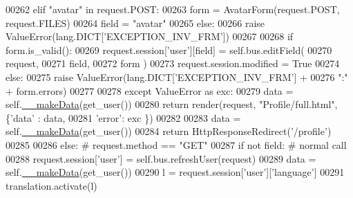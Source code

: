 \begin{DoxyCode}
00262                 \textcolor{keywordflow}{elif} \textcolor{stringliteral}{"avatar"} \textcolor{keywordflow}{in} request.POST:
00263                     form = AvatarForm(request.POST, request.FILES)
00264                     field = \textcolor{stringliteral}{"avatar"}
00265                 \textcolor{keywordflow}{else}:
00266                     \textcolor{keywordflow}{raise} ValueError(lang.DICT[\textcolor{stringliteral}{'EXCEPTION\_INV\_FRM'}])
00267 
00268                 \textcolor{keywordflow}{if} form.is\_valid():
00269                     request.session[\textcolor{stringliteral}{'user'}][field] = self.bus.editField(
00270                                                         request, 
00271                                                         field, 
00272                                                         form )
00273                     request.session.modified = \textcolor{keyword}{True}
00274                 \textcolor{keywordflow}{else}:
00275                     \textcolor{keywordflow}{raise} ValueError(lang.DICT[\textcolor{stringliteral}{'EXCEPTION\_INV\_FRM'}] + 
00276                         \textcolor{stringliteral}{":"} + form.errors)
00277 
00278             \textcolor{keywordflow}{except} ValueError \textcolor{keyword}{as} exc:
00279                 data = self.\hyperlink{classProfile_1_1ProfileUnit_1_1UiFullProfile_ae0e9c54df37ab45f0d1c5d894181d10f}{\_\_makeData}(get\_user())
00280                 \textcolor{keywordflow}{return} render(request, \textcolor{stringliteral}{"Profile/full.html"}, \{\textcolor{stringliteral}{'data'} : data,
00281                                                              \textcolor{stringliteral}{'error'}: exc \})
00282 
00283             data = self.\hyperlink{classProfile_1_1ProfileUnit_1_1UiFullProfile_ae0e9c54df37ab45f0d1c5d894181d10f}{\_\_makeData}(get\_user())
00284             \textcolor{keywordflow}{return} HttpResponseRedirect(\textcolor{stringliteral}{'/profile'})
00285 
00286         \textcolor{keywordflow}{else}: \textcolor{comment}{# request.method == "GET"}
00287             \textcolor{keywordflow}{if} \textcolor{keywordflow}{not} field: \textcolor{comment}{# normal call}
00288                 request.session[\textcolor{stringliteral}{'user'}] = self.bus.refreshUser(request)
00289                 data = self.\hyperlink{classProfile_1_1ProfileUnit_1_1UiFullProfile_ae0e9c54df37ab45f0d1c5d894181d10f}{\_\_makeData}(get\_user())
00290                 l = request.session[\textcolor{stringliteral}{'user'}][\textcolor{stringliteral}{'language'}]
00291                 translation.activate(l)

\end{DoxyCode}
